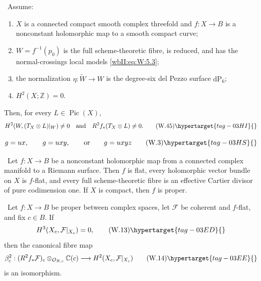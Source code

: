 
\begin{theorem}
\hypertarget{tag-03IX}{}\label{wbII:thm:candidate-conductor}


\ Assume:
\begin{enumerate}[label=(H\arabic*)]
\item $X$ is a connected compact smooth complex threefold and
$f:X\to B$ is a nonconstant holomorphic map to a smooth compact curve;
\item $W=f^{-1}(p_0)$ is the full scheme-theoretic fibre, is reduced, and
has the normal-crossings local models \eqref{wbII:eq:W:5.3};
\item the normalization $\eta:\widetilde W\to W$ is the degree-six del
Pezzo surface $\mathrm{dP}_6$;
\item $H^2(X;\mathbb Z)=0$.
\end{enumerate}
Then, for every $L\in\operatorname{Pic}(X)$,
\[
H^2(W,(T_X\otimes L)|_W)\ne0
\quad\text{and}\quad
R^2f_*(T_X\otimes L)\ne0.
\tag{W.45}\hypertarget{tag-03HI}{}\label{wbII:eq:W:5.18}
\]
\end{theorem}

\[
g=ux,\qquad g=uxy,\qquad\text{or}\qquad g=uxyz
\tag{W.3}\hypertarget{tag-03HS}{}\label{wbII:eq:W:5.3}
\]

\begin{lemma}
\hypertarget{tag-03I8}{}\label{wbII:lem:curve-flatness}


\ Let $f:X\to B$ be a nonconstant holomorphic map from a connected
complex manifold to a Riemann surface.  Then $f$ is flat, every holomorphic
vector bundle on $X$ is $f$-flat, and every full scheme-theoretic fibre is an
effective Cartier divisor of pure codimension one.  If $X$ is compact, then
$f$ is proper.
\end{lemma}

\begin{proposition}
\hypertarget{tag-03II}{}\label{wbII:prop:analytic-base-change}


\ Let $f:X\to B$ be proper between complex spaces, let
$\mathcal F$ be coherent and $f$-flat, and fix $c\in B$.  If
\[
H^3(X_c,\mathcal F|_{X_c})=0,
\tag{W.13}\hypertarget{tag-03ED}{}\label{wbII:eq:W:5.16}
\]
then the canonical fibre map
\[
\beta_c^2:
(R^2f_*\mathcal F)_c\otimes_{\mathcal O_{B,c}}\mathbb C(c)
\longrightarrow H^2(X_c,\mathcal F|_{X_c})
\tag{W.14}\hypertarget{tag-03EE}{}\label{wbII:eq:W:5.17}
\]
is an isomorphism.
\end{proposition}

